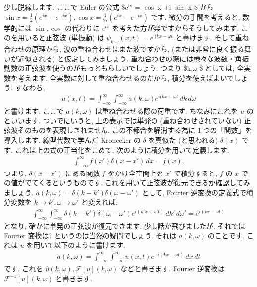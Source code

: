 \documentclass[openany, a4paper, oneside]{book}
\theoremstyle{break}
\theoremstyle{breakdefn}
\begin{document}
少し脱線します. ここで Euler の公式
\$e$^{\mathrm{ix}}$ = $\cos$ x +i $\sin$ x \$
から
$\sin x = \frac{1} {2} ( e^{ix} + e^{-ix} ),\cos x = \frac{1} {2i} ( e^{ix} - e^{-ix} )$
です.
微分の手間を考えると, 数学的には $\sin,\cos$ の代わりに $e^{ix}$ を考えた方が楽ですからそうしてみます.
このを用いると正弦波 (単振動) は
$\psi _{k , \omega } (x,t) = e^{i (kx - \omega t}$
と書けます.
そして重ね合わせの原理から, 波の重ね合わせはまた波ですから,
(または非常に良く振る舞いが近似される) と仮定してみましょう.
重ね合わせの際には様々な波数・角振動数の正弦波を使うのがもっともらしいでしょう.
つまり \$k,$\omega$ \$ としては, 全実数を考えます.
全実数に対して重ね合わせるのだから, 積分を使えばよいでしょう. すなわち,
\begin{align}
u (x,t)
=
\int _{-\infty} ^{\infty} \int _{-\infty} ^{\infty} a (k , \omega ) e^{i (kx - \omega t} \, dk \, d\omega
\end{align}
と書けます.
ここで $a (k,\omega)$ は重ね合わせる際の荷重です.
ちなみにこれを $u$ のといいます.
ついでにいうと, 上の表示では単発の (重ね合わせされていない) 正弦波そのものを表現しきれません.
この不都合を解消する為に 1 つの「関数」を導入します. 線型代数で学んだ Kronecker の $\delta$ を真似た (と思われる)
$\delta (x)$ です. これは上の式の正当化をこめて, 次のように積分を用いて定義します.
\begin{align}
\int _{-\infty} ^{\infty} f (x') \delta (x - x' ) \, dx
=
f (x).
\end{align}
つまり,
$\delta (x - x')$
にある関数 $f$ をかけ全空間上を $x'$ で積分すると,  $f$ の $x$ での値がでてくるというものです.
これを用いて正弦波が復元できるか確認してみましょう.
$a (k, \omega) = \delta (k-k') \delta (\omega - \omega ' )$ として,
Fourier 逆変換の定義式で積分変数を $k\to k', \omega \to \omega '$ と変えれば,
\begin{align}
\int _{-\infty} ^{\infty} \int _{-\infty} ^{\infty}
\delta (k-k') \delta (\omega - \omega ' ) e^{i (k'x - \omega' t)} \, dk' \, d\omega '
=
e^{i (kx - \omega t)}
\end{align}
となり, 確かに単発の正弦波が復元できます.
少し話が飛びましたが, それでは Fourier 変換は? というのは当然の疑問でしょう.
それは $a (k,\omega )$ のことです. これは $u$ を用いて以下のように書けます.
\begin{align}
a (k , \omega )
=
\int _{-\infty} ^{\infty}\int _{-\infty} ^{\infty} u (x,t) e^{-i (kx - \omega t)} \, dx \, dt
\end{align}
です. これを $\hat {u} (k,\omega ), \mathcal{F}[u] (k,\omega)$ などと書きます.
Fourier 逆変換は $\mathcal{F}^{-1}[u] (k,\omega)$ と書きます.
\end{document}

